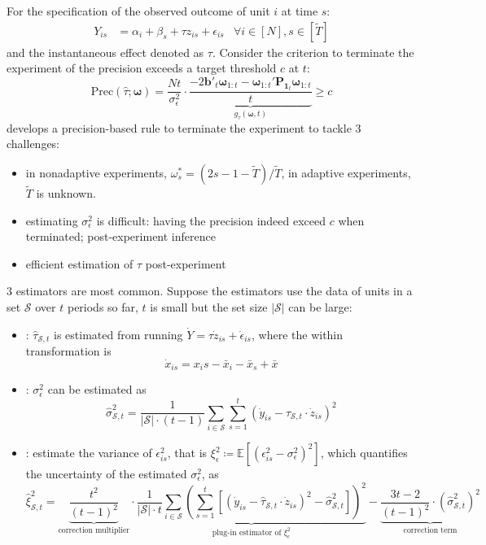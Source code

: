 \documentclass[twoside]{article}
\begin{document}
For the specification of the observed outcome of unit $i$ at time $s$:
\begin{align*}
    Y_{is}&= \alpha_i+\beta_s +\tau z_{is}+\epsilon_{is} & \forall i\in[N],s\in [\tilde{T}]
\end{align*}
and the instantaneous effect denoted as $\tau$. Consider the criterion to terminate the experiment of the precision exceeds a target threshold $c$ at $t$:
\begin{equation}\label{eq:stoppingrule_precision_xiong2024}
    \mathrm{Prec}\left(\hat{\tau};\boldsymbol{\omega}\right) = \frac{Nt}{\sigma^2_{\epsilon}}\cdot \underbrace{\frac{-2\mathbf{b}'_t\boldsymbol{\omega}_{1:t} - \boldsymbol{\omega}_{1:t}'\mathbf{P}_{\mathbf{1}_t}\boldsymbol{\omega}_{1:t}}{t}}_{g_{\tau}\left(\boldsymbol{\omega},t\right)} \geq c
\end{equation}
\citet{xiong2024optimal} develops a precision-based rule to terminate the experiment to tackle 3 challenges:
\begin{itemize}
    \item in nonadaptive experiments, $\omega^*_s = (2s-1-\tilde{T})/\tilde{T}$, in adaptive experiments, $\tilde{T}$ is unknown.
    \item estimating $\sigma^2_{\epsilon}$ is difficult: having the precision indeed exceed $c$ when terminated; post-experiment inference
    \item efficient estimation of $\tau$ post-experiment
\end{itemize}
3 estimators are most common. Suppose the estimators use the data of units in a set $\mathcal{S}$ over $t$ periods so far, $t$ is small but the set size $\left\vert\mathcal{S}\right\vert$ can be large:
\begin{itemize}
    \item {}: $\hat{\tau}_{\mathcal{S},t}$ is estimated from running $\dot{Y} = \tau\dot{z}_{is}+\dot{\epsilon}_{is}$, where the within transformation is $$ \dot{x}_{is} = x_is - \bar{x}_{i}-\bar{x}_{s} + \bar{x} $$
    \item {}: ${\sigma}^2_{\epsilon}$ can be estimated as $$ \hat{\sigma}^2_{\mathcal{S},t}=\frac{1}{\left\vert\mathcal{S}\right\vert\cdot (t-1)} \sum_{i\in\mathcal{S}}\sum^t_{s=1}\left(\dot{y}_{is}-\hat{\tau}_{\mathcal{S},t}\cdot\dot{z}_{is}\right)^2 $$
    \item {}: estimate the variance of $\epsilon^2_{is}$, that is $\xi^2_{\epsilon}\coloneq \mathbb{E}\left[\left(\epsilon^2_{is}-\sigma^2_{\epsilon}\right)^2\right]$, which quantifies the uncertainty of the estimated $\sigma^2_{\epsilon}$, as $$ \hat{\xi}^2_{\mathcal{S},t} = \underbrace{\frac{t^2}{(t-1)^2}}_{\text{correction multiplier}}\cdot \underbrace{ \frac{1}{\left\vert \mathcal{S} \right\vert \cdot t} \sum_{i\in\mathcal{S}}\left(\sum^t_{s=1} \left[ \left(\dot{y}_{is}-\hat{\tau}_{\mathcal{S},t}\cdot\dot{z}_{is}\right)^2 - \hat{\sigma}^2_{\mathcal{S},t}\right] \right)^2 }_{\text{plug-in estimator of }\xi^2_{\epsilon}} - \underbrace{\frac{3t-2}{(t-1)^2} \cdot \left(\hat{\sigma}^2_{\mathcal{S},t}\right)^2}_{\text{correction term}} $$
\end{itemize}
\end{document}
